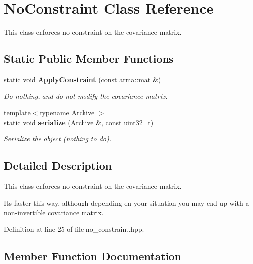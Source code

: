 \section{No\+Constraint Class Reference}
\label{classmlpack_1_1gmm_1_1NoConstraint}


This class enforces no constraint on the covariance matrix.  


\subsection*{Static Public Member Functions}
\begin{DoxyCompactItemize}
\item 
static void \textbf{ Apply\+Constraint} (const arma\+::mat \&)
\begin{DoxyCompactList}\small\item\em Do nothing, and do not modify the covariance matrix. \end{DoxyCompactList}\item 
{\footnotesize template$<$typename Archive $>$ }\\static void \textbf{ serialize} (Archive \&, const uint32\+\_\+t)
\begin{DoxyCompactList}\small\item\em Serialize the object (nothing to do). \end{DoxyCompactList}\end{DoxyCompactItemize}


\subsection{Detailed Description}
This class enforces no constraint on the covariance matrix. 

It\textquotesingle{}s faster this way, although depending on your situation you may end up with a non-\/invertible covariance matrix. 

Definition at line 25 of file no\+\_\+constraint.\+hpp.



\subsection{Member Function Documentation}
\mbox{\label{classmlpack_1_1gmm_1_1NoConstraint_a8d4f28dc4f28a693d03c5b3d7fd64cd3}} 
